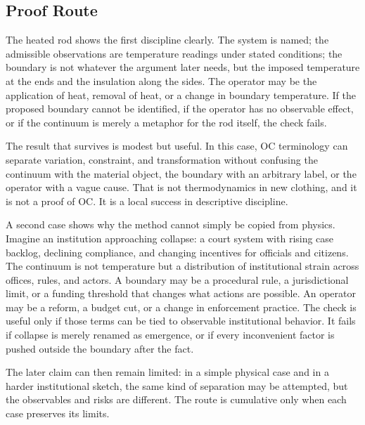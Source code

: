 \documentclass[11pt,a4paper,openany]{book}
\begin{document}
\subsection{Proof Route}
The heated rod shows the first discipline clearly. The system is named; the admissible observations are temperature readings under stated conditions; the boundary is not whatever the argument later needs, but the imposed temperature at the ends and the insulation along the sides. The operator may be the application of heat, removal of heat, or a change in boundary temperature. If the proposed boundary cannot be identified, if the operator has no observable effect, or if the continuum is merely a metaphor for the rod itself, the check fails. \cite{kadanoff_scaling,wilson_renormalization}\par
The result that survives is modest but useful. In this case, OC terminology can separate variation, constraint, and transformation without confusing the continuum with the material object, the boundary with an arbitrary label, or the operator with a vague cause. That is not thermodynamics in new clothing, and it is not a proof of OC. It is a local success in descriptive discipline.\par
A second case shows why the method cannot simply be copied from physics. Imagine an institution approaching collapse: a court system with rising case backlog, declining compliance, and changing incentives for officials and citizens. The continuum is not temperature but a distribution of institutional strain across offices, rules, and actors. A boundary may be a procedural rule, a jurisdictional limit, or a funding threshold that changes what actions are possible. An operator may be a reform, a budget cut, or a change in enforcement practice. The check is useful only if those terms can be tied to observable institutional behavior. It fails if collapse is merely renamed as emergence, or if every inconvenient factor is pushed outside the boundary after the fact.\par
The later claim can then remain limited: in a simple physical case and in a harder institutional sketch, the same kind of separation may be attempted, but the observables and risks are different. The route is cumulative only when each case preserves its limits.\par
\end{document}
